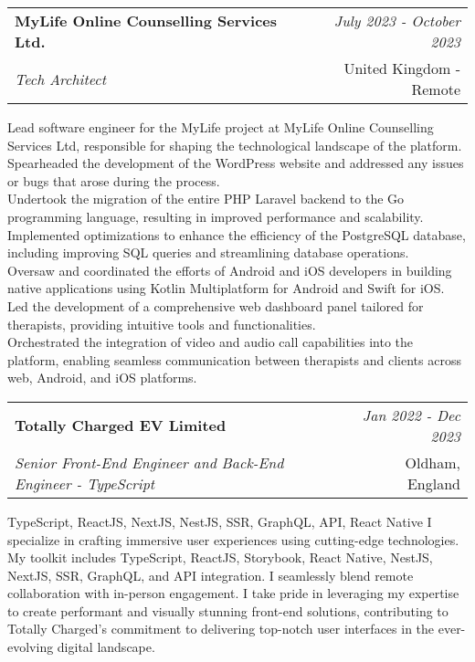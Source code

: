 \documentclass[a4paper,10pt]{article}
\makeatletter
\newcommand{\resumeSubheading}[4]{
	\vspace{0.5mm}\item
	\begin{tabular*}{0.98\textwidth}[t]{l@{\extracolsep{\fill}}r}
		\textbf{#1} & \textit{\footnotesize{#4}} \\
		\textit{\footnotesize{#3}} &  \footnotesize{#2}\\
	\end{tabular*}
	\vspace{-2.4mm}
}
\newcommand{\resumeItemListStart}{\begin{justify}\begin{itemize}[leftmargin=3ex, rightmargin=2ex, noitemsep,labelsep=1.2mm,itemsep=0mm]\small}
\newcommand{\resumeItemListEnd}{\end{itemize}\end{justify}\vspace{-2mm}}
\makeatother
\begin{document}
\vspace{-1mm}
\resumeSubheading
{MyLife Online Counselling Services Ltd.}{United Kingdom - Remote}
{Tech Architect}{July 2023 - October 2023}
\resumeItemListStart
Lead software engineer for the MyLife project at MyLife Online Counselling Services Ltd, responsible for shaping the technological landscape of the platform. \\
Spearheaded the development of the WordPress website and addressed any issues or bugs that arose during the process. \\
Undertook the migration of the entire PHP Laravel backend to the Go programming language, resulting in improved performance and scalability. \\
Implemented optimizations to enhance the efficiency of the PostgreSQL database, including improving SQL queries and streamlining database operations. \\
Oversaw and coordinated the efforts of Android and iOS developers in building native applications using Kotlin Multiplatform for Android and Swift for iOS. \\
Led the development of a comprehensive web dashboard panel tailored for therapists, providing intuitive tools and functionalities. \\
Orchestrated the integration of video and audio call capabilities into the platform, enabling seamless communication between therapists and clients across web, Android, and iOS platforms.
\resumeItemListEnd

\vspace{-1mm}
\resumeSubheading
{Totally Charged EV Limited}{Oldham, England}
{Senior Front-End Engineer and Back-End Engineer - TypeScript}{Jan 2022 - Dec 2023}
\resumeItemListStart
{TypeScript, ReactJS, NextJS, NestJS, SSR, GraphQL, API, React Native}
I specialize in crafting immersive user experiences using cutting-edge technologies. My toolkit includes TypeScript, ReactJS, Storybook, React Native, NestJS, NextJS, SSR, GraphQL, and API integration. I seamlessly blend remote collaboration with in-person engagement. I take pride in leveraging my expertise to create performant and visually stunning front-end solutions, contributing to Totally Charged's commitment to delivering top-notch user interfaces in the ever-evolving digital landscape.
\resumeItemListEnd
\end{document}
